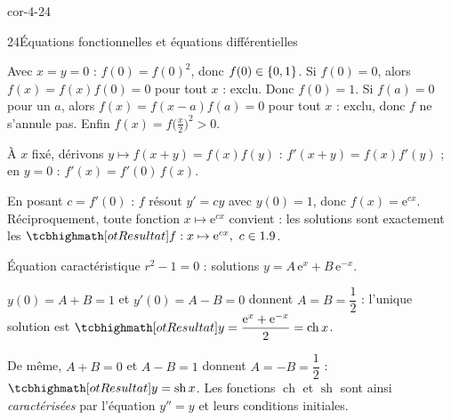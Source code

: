 \begin{blocLivre}{cor-4-24}
\begin{corrige}{24}{Équations fonctionnelles et équations différentielles}
\begin{questions}
  \item Avec $x=y=0$ : $f(0)=f(0)^{2}$, donc $f(0)\in\left\{0,1\right\}$. Si
    $f(0)=0$, alors $f(x)=f(x)f(0)=0$ pour tout $x$ : exclu. Donc $f(0)=1$.
    Si $f(a)=0$ pour un $a$, alors $f(x)=f(x-a)f(a)=0$ pour tout $x$ :
    exclu, donc $f$ ne s'annule pas. Enfin
    $f(x)=f\bigl(\frac{x}{2}\bigr)^{2}>0$.
  \item À $x$ fixé, dérivons $y\mapsto f(x+y)=f(x)f(y)$ :
    $f'(x+y)=f(x)f'(y)$ ; en $y=0$ : $f'(x)=f'(0)\,f(x)$.
  \item En posant $c=f'(0)$ : $f$ résout $y'=cy$ avec $y(0)=1$, donc
    $f(x)=\mathrm{e}^{cx}$. Réciproquement, toute fonction
    $x\mapsto\mathrm{e}^{cx}$ convient : les solutions sont exactement les
    $\res{f:x\mapsto\mathrm{e}^{cx},\ c\in\R}$.
  \item Équation caractéristique $r^{2}-1=0$ : solutions
    $y=A\,\mathrm{e}^{x}+B\,\mathrm{e}^{-x}$.
  \item $y(0)=A+B=1$ et $y'(0)=A-B=0$ donnent $A=B=\dfrac12$ :
    l'unique solution est
    $\res{y=\dfrac{\mathrm{e}^{x}+\mathrm{e}^{-x}}{2}=\operatorname{ch}x}$.
  \item De même, $A+B=0$ et $A-B=1$ donnent $A=-B=\dfrac12$ :
    $\res{y=\operatorname{sh}x}$. Les fonctions $\operatorname{ch}$ et
    $\operatorname{sh}$ sont ainsi \emph{caractérisées} par l'équation
    $y''=y$ et leurs conditions initiales.
\end{questions}
\end{corrige}
\end{blocLivre}


